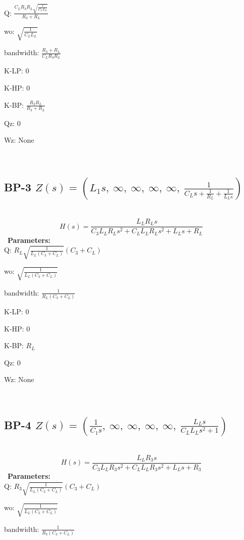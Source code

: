 \documentclass{article}
\begin{document}
Q: $\frac{C_{L} R_{3} R_{L} \sqrt{\frac{1}{C_{L} L_{L}}}}{R_{3} + R_{L}}$\ 

wo: $\sqrt{\frac{1}{C_{L} L_{L}}}$\ 

bandwidth: $\frac{R_{3} + R_{L}}{C_{L} R_{3} R_{L}}$\ 

K-LP: $0$\ 

K-HP: $0$\ 

K-BP: $\frac{R_{3} R_{L}}{R_{3} + R_{L}}$\ 

Qz: $0$\ 

Wz: $\text{None}$\ 

\ 

\subsection{BP-3 $Z(s) = \left( L_{1} s, \  \infty, \  \infty, \  \infty, \  \infty, \  \frac{1}{C_{L} s + \frac{1}{R_{L}} + \frac{1}{L_{L} s}}\right)$ } \ 
\textbf{\[H(s) = \frac{L_{L} R_{L} s}{C_{3} L_{L} R_{L} s^{2} + C_{L} L_{L} R_{L} s^{2} + L_{L} s + R_{L}}\] } \ 
\textbf{Parameters:}\\ 

Q: $R_{L} \sqrt{\frac{1}{L_{L} \left(C_{3} + C_{L}\right)}} \left(C_{3} + C_{L}\right)$\ 

wo: $\sqrt{\frac{1}{L_{L} \left(C_{3} + C_{L}\right)}}$\ 

bandwidth: $\frac{1}{R_{L} \left(C_{3} + C_{L}\right)}$\ 

K-LP: $0$\ 

K-HP: $0$\ 

K-BP: $R_{L}$\ 

Qz: $0$\ 

Wz: $\text{None}$\ 

\ 

\subsection{BP-4 $Z(s) = \left( \frac{1}{C_{1} s}, \  \infty, \  \infty, \  \infty, \  \infty, \  \frac{L_{L} s}{C_{L} L_{L} s^{2} + 1}\right)$ } \ 
\textbf{\[H(s) = \frac{L_{L} R_{3} s}{C_{3} L_{L} R_{3} s^{2} + C_{L} L_{L} R_{3} s^{2} + L_{L} s + R_{3}}\] } \ 
\textbf{Parameters:}\\ 

Q: $R_{3} \sqrt{\frac{1}{L_{L} \left(C_{3} + C_{L}\right)}} \left(C_{3} + C_{L}\right)$\ 

wo: $\sqrt{\frac{1}{L_{L} \left(C_{3} + C_{L}\right)}}$\ 

bandwidth: $\frac{1}{R_{3} \left(C_{3} + C_{L}\right)}$\ 
\end{document}

